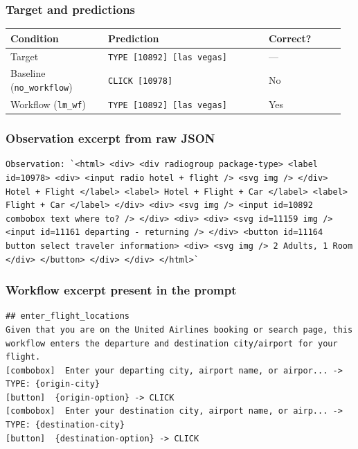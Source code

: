 \subsubsection{Target and
predictions}

{\def\LTcaptype{} %
\begin{longtable}[]{@{}>{\raggedright\arraybackslash}p{0.28\linewidth}>{\raggedright\arraybackslash}p{0.46\linewidth}>{\raggedright\arraybackslash}p{0.22\linewidth}@{}}
\toprule\noalign{}
Condition & Prediction & Correct? \\
\midrule\noalign{}
\endhead
\bottomrule\noalign{}
\endlastfoot
Target & \texttt{TYPE\ {[}10892{]}\ {[}las\ vegas{]}} & --- \\
Baseline (\texttt{no\_workflow}) & \texttt{CLICK\ {[}10978{]}} & No \\
Workflow (\texttt{lm\_wf}) &
\texttt{TYPE\ {[}10892{]}\ {[}las\ vegas{]}} & Yes \\
\end{longtable}
}

\subsubsection{Observation excerpt from raw
JSON}

\begin{verbatim}
Observation: `<html> <div> <div radiogroup package-type> <label id=10978> <div> <input radio hotel + flight /> <svg img /> </div> Hotel + Flight </label> <label> Hotel + Flight + Car </label> <label> Flight + Car </label> </div> <div> <svg img /> <input id=10892 combobox text where to? /> </div> <div> <div> <svg id=11159 img /> <input id=11161 departing - returning /> </div> <button id=11164 button select traveler information> <div> <svg img /> 2 Adults, 1 Room </div> </button> </div> </div> </html>`
\end{verbatim}

\subsubsection{Workflow excerpt present in the
prompt}

\begin{verbatim}
## enter_flight_locations
Given that you are on the United Airlines booking or search page, this workflow enters the departure and destination city/airport for your flight.
[combobox]  Enter your departing city, airport name, or airpor... -> TYPE: {origin-city}
[button]  {origin-option} -> CLICK
[combobox]  Enter your destination city, airport name, or airp... -> TYPE: {destination-city}
[button]  {destination-option} -> CLICK
\end{verbatim}

